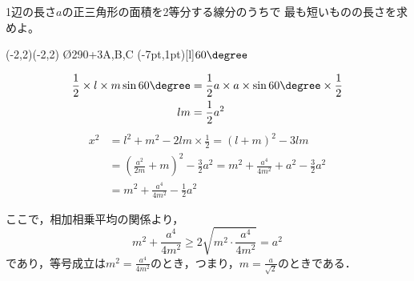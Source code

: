 
\begin{problem}
1辺の長さ$a$の正三角形の面積を2等分する線分のうちで
最も短いものの長さを求めよ。
\end{problem}


\begin{mawarikomi}{}{
\begin{pszahyou*}[ul=10mm](-2,2)(-2,2)
  \EnkoToubun\O{2}{90}{+}{3}{A,B,C}
  \Takakkei{\A\B\C}
  \Bunten\B{}\D
  \Bunten\A{}\E
  \Drawline{\D\E}
  \Kakukigou\A\C\B(-7pt,1pt)[l]{$60\degree$}
  \HenKo\B{}
  \HenKo\A{}
  \HenKo\E{}
  \HenKo\C{}
\end{pszahyou*}
}
\begin{align*}
  \frac12 \times l \times m \sin 60\degree
  &= \frac12 a \times a \times \sin 60\degree \times \frac12 \\
  lm &= \frac12 a^2
\end{align*}
\begin{align*}
  x^2 &= l^2 + m^2 - 2lm \times \frac12 = (l+m)^2 -3lm\\
  &= \left( \frac{a^2}{2m} + m \right)^2 - \frac32 a^2
  = m^2 + \frac{a^4}{4m^2} + a^2 - \frac32 a^2 \\
  &= m^2 + \frac{a^4}{4m^2} - \frac12 a^2
\end{align*}
\end{mawarikomi}
ここで，相加相乗平均の関係より，
\[m^2 + \frac{a^4}{4m^2} \geq 2 \sqrt{m^2 \cdot \frac{a^4}{4m^2}} = a^2\]
であり，等号成立は$m^2 = \frac{a^4}{4m^2}$のとき，つまり，$m = \frac{a}{\sqrt2}$のときである．

